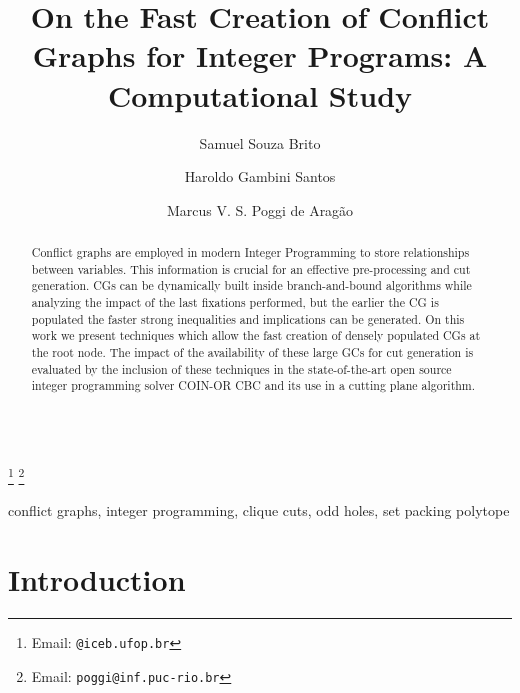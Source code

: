 \documentclass{endm}
\begin{document}
  

\begin{verbatim}\end{verbatim}\vspace{2.5cm}

\begin{frontmatter}

\title{On the Fast Creation of Conflict Graphs for Integer Programs: A Computational Study}

\author{Samuel Souza Brito \and Haroldo Gambini Santos}
 
\address{Departamento de Computação\\ Universidade Federal de Ouro Preto - UFOP\\ Ouro Preto, Brazil}
\author{Marcus V. S. Poggi de Aragão}
\address{Departamento de Informática\\ Pontifícia Universidade Católica do Rio de Janeiro - PUC-RIO\\ Rio de Janeiro, Brazil}
\thanks[mailSamuelHaroldo]{Email: {\texttt{@iceb.ufop.br}}} 
\thanks[mailPoggi]{Email: {\texttt{\normalshape poggi@inf.puc-rio.br}}}  

\begin{abstract}
Conflict graphs are employed in modern Integer Programming to store relationships between variables. This information is crucial for an effective pre-processing and cut generation. CGs can be dynamically built inside branch-and-bound algorithms while analyzing the impact of the last fixations performed, but the earlier the CG is populated the faster strong inequalities and implications can be generated. On this work we present techniques which allow the fast creation of densely populated CGs at the root node. The impact of the availability of these large GCs for cut generation is evaluated by the inclusion of these techniques in the state-of-the-art open source integer programming solver COIN-OR CBC and its use in a cutting plane algorithm.
\end{abstract}

\begin{keyword}
conflict graphs, integer programming, clique cuts, odd holes, set packing polytope
\end{keyword}

\end{frontmatter}


\section{Introduction}\label{intro}
\end{document}
